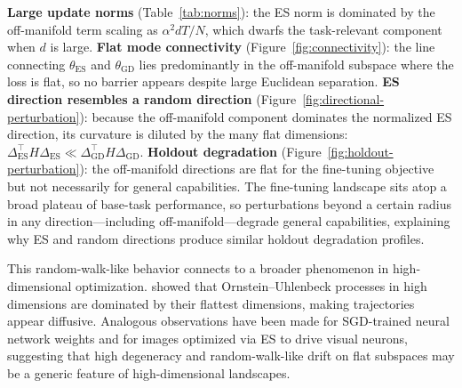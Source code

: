 \textbf{Large update norms} (Table~\ref{tab:norms}): the ES norm is dominated by the off-manifold term scaling as $\alpha^2 dT/N$, which dwarfs the task-relevant component when $d$ is large.
%
\textbf{Flat mode connectivity} (Figure~\ref{fig:connectivity}): the line connecting $\theta_{\mathrm{ES}}$ and $\theta_{\mathrm{GD}}$ lies predominantly in the off-manifold subspace where the loss is flat, so no barrier appears despite large Euclidean separation.
%
\textbf{ES direction resembles a random direction} (Figure~\ref{fig:directional-perturbation}): because the off-manifold component dominates the normalized ES direction, its curvature is diluted by the many flat dimensions: $\Delta_{\mathrm{ES}}^\top H \Delta_{\mathrm{ES}} \ll \Delta_{\mathrm{GD}}^\top H \Delta_{\mathrm{GD}}$.
%
\textbf{Holdout degradation} (Figure~\ref{fig:holdout-perturbation}): the off-manifold directions are flat for the fine-tuning objective but not necessarily for general capabilities. The fine-tuning landscape sits atop a broad plateau of base-task performance, so perturbations beyond a certain radius in any direction—including off-manifold—degrade general capabilities, explaining why ES and random directions produce similar holdout degradation profiles.
 
\begin{remark}
This random-walk-like behavior connects to a broader phenomenon in high-dimensional optimization. \citet{antognini2018pca_highdim_random_walk} showed that Ornstein--Uhlenbeck processes in high dimensions are dominated by their flattest dimensions, making trajectories appear diffusive. Analogous observations have been made for SGD-trained neural network weights and for images optimized via ES to drive visual neurons, suggesting that high degeneracy and random-walk-like drift on flat subspaces may be a generic feature of high-dimensional landscapes.
\end{remark}